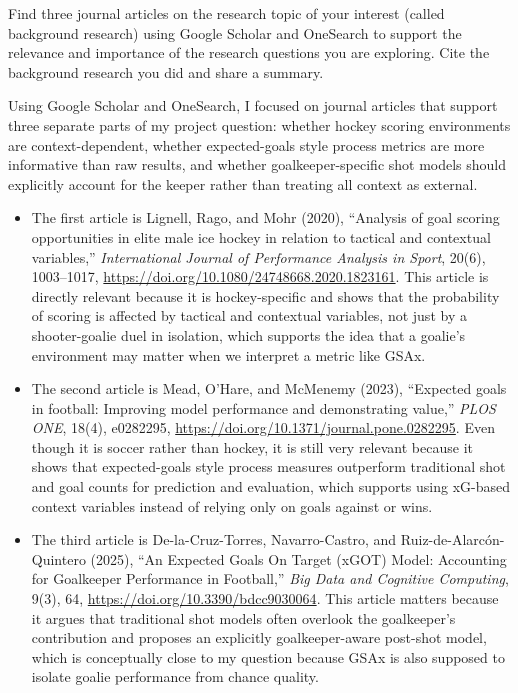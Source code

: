 \documentclass[
  10pt,
]{extarticle}
\providecommand{\tightlist}{%
  \setlength{\itemsep}{0pt}\setlength{\parskip}{0pt}}
\begin{document}
\begin{problem}[Problem 2 (b)]
Find three journal articles on the research topic of your interest (called background research) using Google Scholar and OneSearch to support the relevance and importance of the research questions you are exploring. Cite the background research you did and share a summary.
\end{problem}

Using Google Scholar and OneSearch, I focused on journal articles that support three separate parts of my project question: whether hockey scoring environments are context-dependent, whether expected-goals style process metrics are more informative than raw results, and whether goalkeeper-specific shot models should explicitly account for the keeper rather than treating all context as external.

\begin{itemize}
\tightlist
\item
  The first article is Lignell, Rago, and Mohr (2020), ``Analysis of goal scoring opportunities in elite male ice hockey in relation to tactical and contextual variables,'' \textit{International Journal of Performance Analysis in Sport}, 20(6), 1003--1017, \href{https://doi.org/10.1080/24748668.2020.1823161}{https://doi.org/10.1080/24748668.2020.1823161}. This article is directly relevant because it is hockey-specific and shows that the probability of scoring is affected by tactical and contextual variables, not just by a shooter-goalie duel in isolation, which supports the idea that a goalie's environment may matter when we interpret a metric like GSAx.
\item
  The second article is Mead, O'Hare, and McMenemy (2023), ``Expected goals in football: Improving model performance and demonstrating value,'' \textit{PLOS ONE}, 18(4), e0282295, \href{https://doi.org/10.1371/journal.pone.0282295}{https://doi.org/10.1371/journal.pone.0282295}. Even though it is soccer rather than hockey, it is still very relevant because it shows that expected-goals style process measures outperform traditional shot and goal counts for prediction and evaluation, which supports using xG-based context variables instead of relying only on goals against or wins.
\item
  The third article is De-la-Cruz-Torres, Navarro-Castro, and Ruiz-de-Alarcón-Quintero (2025), ``An Expected Goals On Target (xGOT) Model: Accounting for Goalkeeper Performance in Football,'' \textit{Big Data and Cognitive Computing}, 9(3), 64, \href{https://doi.org/10.3390/bdcc9030064}{https://doi.org/10.3390/bdcc9030064}. This article matters because it argues that traditional shot models often overlook the goalkeeper's contribution and proposes an explicitly goalkeeper-aware post-shot model, which is conceptually close to my question because GSAx is also supposed to isolate goalie performance from chance quality.
\end{itemize}
\end{document}
